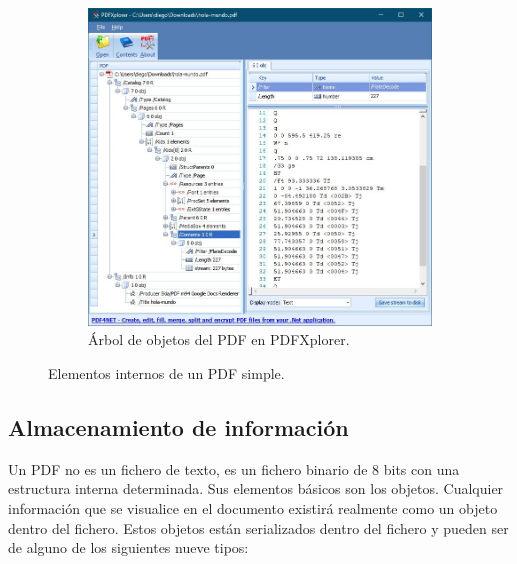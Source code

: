 \begin{figure}
\begin{subfigure}[b]{0.7\textwidth}
        \includegraphics[width=\textwidth]{imaxes/c-bases-teoricas/hola-mundo-pdfxplorer}
        \caption{Árbol de objetos del PDF en PDFXplorer.}
        \label{fig:hola-mundo-pdfxplorer}
    \end{subfigure}
    \caption{Elementos internos de un PDF simple.}
    \label{fig:estructura-interna-pdf}
\end{figure}


\subsection{Almacenamiento de información}

Un PDF no es un fichero de texto, es un fichero binario de 8 bits con una estructura interna determinada. Sus elementos básicos son los objetos. Cualquier información que se visualice en el documento existirá realmente como un objeto dentro del fichero. Estos objetos están serializados dentro del fichero y pueden ser de alguno de los siguientes nueve tipos:

